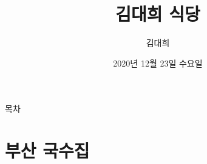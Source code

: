 \documentclass[aspectratio=1610,17pt,xcolor=pdftex,dvipsnames,table,handout]{beamer}
\begin{document}
	

			\title{ 김대희 식당 }
			\author{ 김대희 }
			\date{ 2020년 
					12월
					23일 
					수요일 }


%
%


		\begin{frame}[plain]
		\titlepage
		\end{frame}

		\begin{frame} [plain]{목차}
		\tableofcontents%


%
%
%


		\end{frame}

		\begin{frame} [plain]
		\end{frame}
		\begin{frame} [plain]
		\end{frame}


		\part{ 부산 국수집}
		\frame{\partpage}
\end{document}
